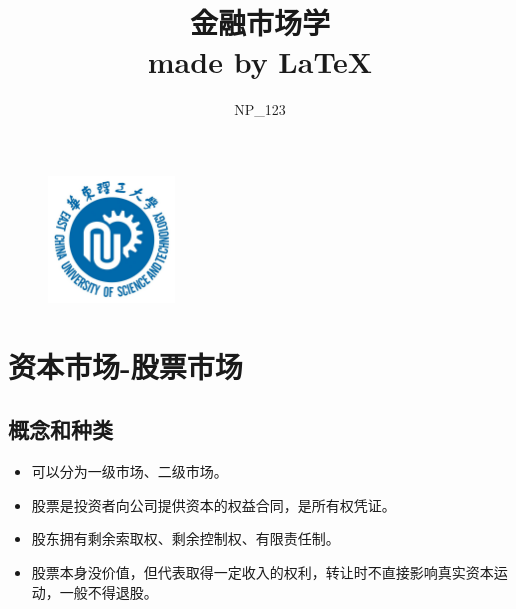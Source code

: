 \documentclass{article}
\title{\Huge 金融市场学    \\\large made by  \LaTeX}
\author{NP\_123}
\begin{document}
 
\begin{figure}[H]
    \begin{center}
        \includegraphics[width=0.3\textwidth]{logo.jpeg}
        \maketitle
    \end{center}
\end{figure}
\thispagestyle{empty}
\clearpage
\section*{\center\Huge 资本市场-股票市场}
\subsection*{概念和种类}
\begin{itemize}
    \item 可以分为一级市场、二级市场。
    \item 股票是投资者向公司提供资本的权益合同，是所有权凭证。
    \item 股东拥有剩余索取权、剩余控制权、有限责任制。
    \item 股票本身没价值，但代表取得一定收入的权利，转让时不直接影响真实资本运动，一般不得退股。
\end{itemize}
\end{document}
